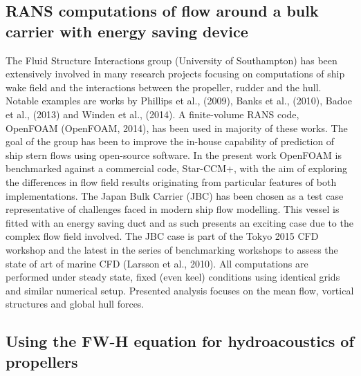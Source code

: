 \documentclass[a4paper,10pt]{article}
\begin{document}
\subsection{RANS computations of flow around a bulk carrier with energy saving device \cite{Lidtke2015b}}

	The Fluid Structure Interactions group (University of Southampton) has been extensively involved in many research projects focusing on computations of ship wake field and the interactions between the propeller, rudder and the hull. Notable examples are works by Phillips et al., (2009), Banks et al., (2010), Badoe et al., (2013) and Winden et al., (2014). A finite-volume RANS code, OpenFOAM (OpenFOAM, 2014), has been used in majority of these works. The goal of the group has been to improve the in-house capability of prediction of ship stern flows using open-source software. In the present work OpenFOAM is benchmarked against a commercial code, Star-CCM+, with the aim of exploring the differences in flow field results originating from particular features of both implementations. The Japan Bulk Carrier (JBC) has been chosen as a test case representative of challenges faced in modern ship flow modelling. This vessel is fitted with an energy saving duct and as such presents an exciting case due to the complex flow field involved. The JBC case is part of the Tokyo 2015 CFD workshop and the latest in the series of benchmarking workshops to assess the state of art of marine CFD (Larsson et al., 2010). All computations are performed under steady state, fixed (even keel) conditions using identical grids and similar numerical setup. Presented analysis focuses on the mean flow, vortical structures and global hull forces.

\subsection{Using the FW-H equation for hydroacoustics of propellers \cite{Lloyd2015a}}
\end{document}
